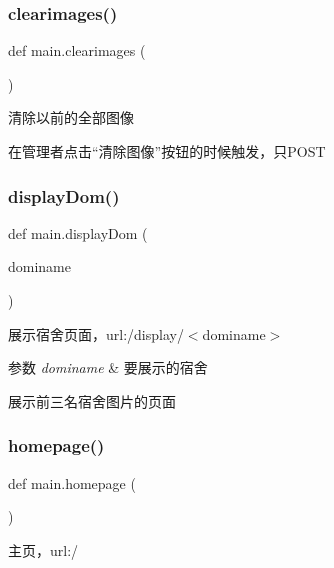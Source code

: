 \subsubsection{\texorpdfstring{clearimages()}{clearimages()}}
{\footnotesize\ttfamily def main.\+clearimages (\begin{DoxyParamCaption}{ }\end{DoxyParamCaption})}



清除以前的全部图像 

在管理者点击“清除图像”按钮的时候触发，只\+P\+O\+ST \mbox{\label{group___xE8_xB7_xAF_xE7_x94_xB1_xE5_x87_xBD_xE6_x95_xB0_ga037a19c20276c539ad0c761b8d54e36f}} 
\subsubsection{\texorpdfstring{displayDom()}{displayDom()}}
{\footnotesize\ttfamily def main.\+display\+Dom (\begin{DoxyParamCaption}\item[{}]{dominame }\end{DoxyParamCaption})}



展示宿舍页面，url\+:\textquotesingle{}/display/$<$dominame$>$\textquotesingle{} 


\begin{DoxyParams}{参数}
{\em dominame} & 要展示的宿舍\\
\hline
\end{DoxyParams}
展示前三名宿舍图片的页面 \mbox{\label{group___xE8_xB7_xAF_xE7_x94_xB1_xE5_x87_xBD_xE6_x95_xB0_gab78667d84f4fdf0575af2adb306417c4}} 
\subsubsection{\texorpdfstring{homepage()}{homepage()}}
{\footnotesize\ttfamily def main.\+homepage (\begin{DoxyParamCaption}{ }\end{DoxyParamCaption})}



主页，url\+:\textquotesingle{}/\textquotesingle{} 

